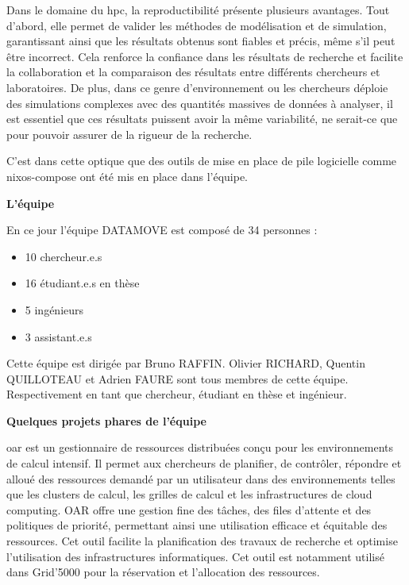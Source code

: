 \documentclass[a4paper,french,12pt, titlepage]{article}
\begin{document}
Dans le domaine du \Gls{hpc}, la reproductibilité présente plusieurs
avantages. Tout d'abord, elle permet de valider les méthodes de
modélisation et de simulation, garantissant ainsi que les résultats
obtenus sont fiables et précis, même s'il peut être incorrect. Cela
renforce la confiance dans les résultats de recherche et facilite la
collaboration et la comparaison des résultats entre différents
chercheurs et laboratoires. De plus, dans ce genre d'environnement ou
les chercheurs déploie des simulations complexes avec des quantités
massives de données à analyser, il est essentiel que ces résultats
puissent avoir la même variabilité, ne serait-ce que pour pouvoir
assurer de la rigueur de la recherche.\newline

C'est dans cette optique que des outils de mise en place de pile
logicielle comme \Gls{nixos-compose} ont été mis en place dans
l'équipe.\newline

\textbf{L'équipe}\newline

En ce jour l'équipe DATAMOVE est composé de 34 personnes :

\begin{itemize}
\item
  10 chercheur.e.s
\item
  16 étudiant.e.s en thèse
\item
  5 ingénieurs
\item
  3 assistant.e.s\newline
\end{itemize}

Cette équipe est dirigée par Bruno RAFFIN. Olivier RICHARD, Quentin
QUILLOTEAU et Adrien FAURE sont tous membres de cette équipe.
Respectivement en tant que chercheur, étudiant en thèse et
ingénieur.\newline

\textbf{Quelques projets phares de l'équipe}\newline

\Gls{oar} est un gestionnaire de ressources distribuées conçu pour les
environnements de calcul intensif. Il permet aux chercheurs de
planifier, de contrôler, répondre et alloué des ressources demandé par
un utilisateur dans des environnements telles que les clusters de
calcul, les grilles de calcul et les infrastructures de cloud computing.
OAR offre une gestion fine des tâches, des files d'attente et des
politiques de priorité, permettant ainsi une utilisation efficace et
équitable des ressources. Cet outil facilite la planification des
travaux de recherche et optimise l'utilisation des infrastructures
informatiques. Cet outil est notamment utilisé dans Grid'5000 pour la
réservation et l'allocation des ressources.\newline
\end{document}
